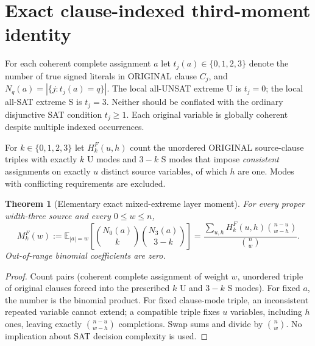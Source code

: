\documentclass[10pt]{article}
\newtheorem{theorem}{Theorem}
\begin{document}
\section{Exact clause-indexed third-moment identity}
For each coherent complete assignment $a$ let $t_j(a)\in\{0,1,2,3\}$ denote the number of true signed literals in ORIGINAL clause $C_j$, and $N_q(a)=|\{j:t_j(a)=q\}|$. The local all-UNSAT extreme U is $t_j=0$; the local all-SAT extreme S is $t_j=3$. Neither should be conflated with the ordinary disjunctive SAT condition $t_j\ge1$. Each original variable is globally coherent despite multiple indexed occurrences.

For $k\in\{0,1,2,3\}$ let $H^F_k(u,h)$ count the unordered ORIGINAL source-clause triples with exactly $k$ U modes and $3-k$ S modes that impose \emph{consistent} assignments on exactly $u$ distinct source variables, of which $h$ are one. Modes with conflicting requirements are excluded.

\begin{theorem}[Elementary exact mixed-extreme layer moment]
For every proper width-three source and every $0\le w\le n$,
\[
M_k^F(w):=\mathbb E_{|a|=w}\left[\binom{N_0(a)}k\binom{N_3(a)}{3-k}\right]
=\frac{\sum_{u,h}H^F_k(u,h)\binom{n-u}{w-h}}{\binom nw}.
\]
Out-of-range binomial coefficients are zero.
\end{theorem}
\begin{proof}
Count pairs (coherent complete assignment of weight $w$, unordered triple of original clauses forced into the prescribed $k$ U and $3-k$ S modes). For fixed $a$, the number is the binomial product. For fixed clause-mode triple, an inconsistent repeated variable cannot extend; a compatible triple fixes $u$ variables, including $h$ ones, leaving exactly $\binom{n-u}{w-h}$ completions. Swap sums and divide by $\binom nw$. No implication about SAT decision complexity is used.
\end{proof}
\end{document}
